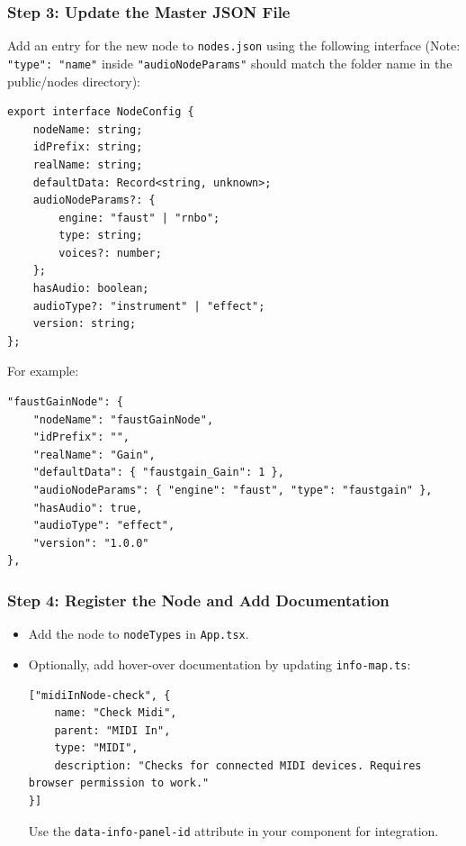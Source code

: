 \documentclass[10pt,twocolumn]{article}
\begin{document}
\subsubsection{Step 3: Update the Master JSON File}
Add an entry for the new node to \texttt{nodes.json} using the following interface (Note: \texttt{"type": "name"} inside \texttt{"audioNodeParams"} should match the folder name in the public/nodes directory):
\begin{lstlisting}
export interface NodeConfig {
    nodeName: string;
    idPrefix: string;
    realName: string;
    defaultData: Record<string, unknown>;
    audioNodeParams?: {
        engine: "faust" | "rnbo";
        type: string;
        voices?: number;
    };
    hasAudio: boolean;
    audioType?: "instrument" | "effect";
    version: string;
};
\end{lstlisting}
For example:
\begin{lstlisting}
"faustGainNode": {
    "nodeName": "faustGainNode",
    "idPrefix": "",
    "realName": "Gain",
    "defaultData": { "faustgain_Gain": 1 },
    "audioNodeParams": { "engine": "faust", "type": "faustgain" },
    "hasAudio": true,
    "audioType": "effect",
    "version": "1.0.0"
},
\end{lstlisting}

\subsubsection{Step 4: Register the Node and Add Documentation}
\begin{itemize}
    \item Add the node to \texttt{nodeTypes} in \texttt{App.tsx}.
    \item Optionally, add hover-over documentation by updating \texttt{info-map.ts}:
\begin{lstlisting}
["midiInNode-check", {
    name: "Check Midi",
    parent: "MIDI In",
    type: "MIDI",
    description: "Checks for connected MIDI devices. Requires browser permission to work."
}]
\end{lstlisting}
    Use the \texttt{data-info-panel-id} attribute in your component for integration.
\end{itemize}
\end{document}
